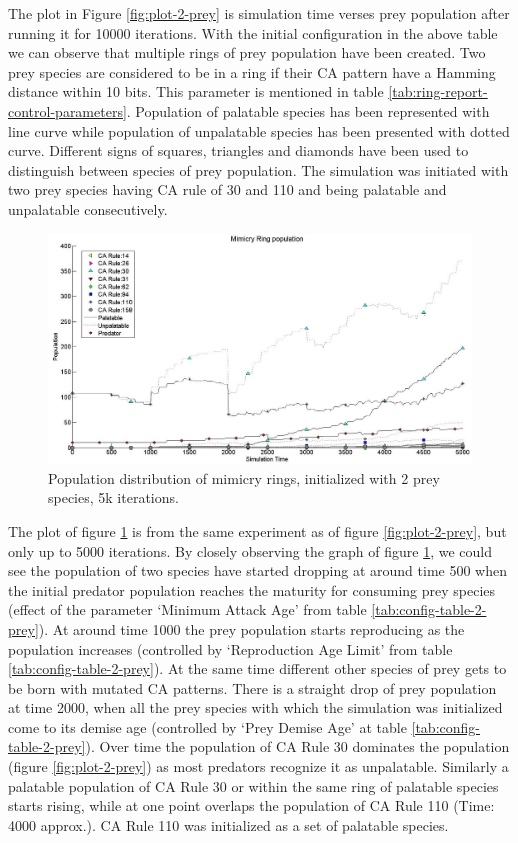 The plot in Figure \ref{fig:plot-2-prey} is simulation time verses prey population after running it for 10000 iterations. With the initial configuration in the above table we can observe that multiple rings of prey population have been created. Two prey species are considered to be in a ring if their CA pattern have a Hamming distance within 10 bits. This parameter is mentioned in table \ref{tab:ring-report-control-parameters}. Population of palatable species has been represented with line curve while population of unpalatable species has been presented with dotted curve. Different signs of squares, triangles and diamonds have been used to distinguish between species of prey population. The simulation was initiated with two prey species having CA rule of 30 and 110 and being palatable and unpalatable consecutively.

\begin{figure}[H]
	\centering
	\includegraphics[scale=0.40]{images/simTime5k-2Prey}
	\caption[Population distribution of mimicry rings (2 prey species, 5k iterations)]{Population distribution of mimicry rings, initialized with 2 prey species, 5k iterations.}
	\label{fig:plot-2-prey-5k}
\end{figure}

The plot of figure \ref{fig:plot-2-prey-5k} is from the same experiment as of figure \ref{fig:plot-2-prey}, but only up to 5000 iterations. By closely observing the graph of figure \ref{fig:plot-2-prey-5k}, we could see the population of two species have started dropping at around time 500 when the initial predator population reaches the maturity for consuming prey species (effect of the parameter `Minimum Attack Age' from table \ref{tab:config-table-2-prey}). At around time 1000 the prey population starts reproducing as the population increases (controlled by `Reproduction Age Limit' from table \ref{tab:config-table-2-prey}). At the same time different other species of prey gets to be born with mutated CA patterns. There is a straight drop of prey population at time 2000, when all the prey species with which the simulation was initialized come to its demise age (controlled by `Prey Demise Age' at table \ref{tab:config-table-2-prey}). Over time the population of CA Rule 30 dominates the population (figure \ref{fig:plot-2-prey}) as most predators recognize it as unpalatable. Similarly a palatable population of CA Rule 30 or within the same ring of palatable species starts rising, while at one point overlaps the population of CA Rule 110 (Time: 4000 approx.). CA Rule 110 was initialized as a set of palatable species.

